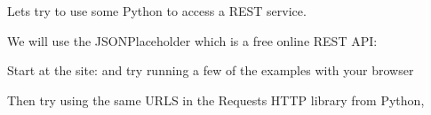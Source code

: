 \documentclass[Screen16to9,17pt]{foils}
\begin{document}

\inputminted{python}{programs/rest-1.py}

\begin{list2}
\item  Lets try to use some Python to access a REST service.
\item  We will use the JSONPlaceholder which is a free online REST API:
\item Start at the site:  and try running a few of the examples with your browser
\item Then try using the same URLS in the Requests HTTP library from Python,\\
\end{list2}
\slidenext
\end{document}
